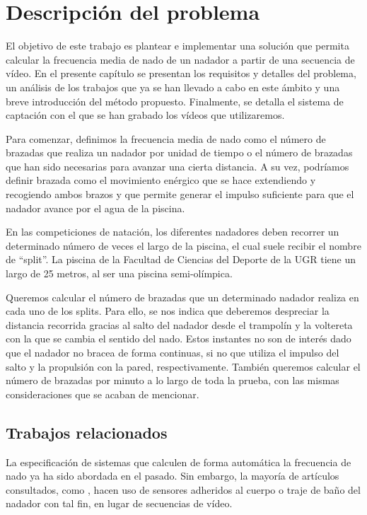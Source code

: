 \chapter{Descripción del problema} \label{cap:capitulo2}

El objetivo de este trabajo es plantear e implementar una solución que permita calcular la frecuencia media de nado de un nadador a partir de una secuencia de vídeo. En el presente capítulo se presentan los requisitos y detalles del problema, un análisis de los trabajos que ya se han llevado a cabo en este ámbito y una breve introducción del método propuesto. Finalmente, se detalla el sistema de captación con el que se han grabado los vídeos que utilizaremos.

Para comenzar, definimos la frecuencia media de nado como el número de brazadas que realiza un nadador por unidad de tiempo o el número de brazadas que han sido necesarias para avanzar una cierta distancia. A su vez, podríamos definir brazada como el movimiento enérgico que se hace extendiendo y recogiendo ambos brazos y que permite generar el impulso suficiente para que el nadador avance por el agua de la piscina.  

En las competiciones de natación, los diferentes nadadores deben recorrer un determinado número de veces el largo de la piscina, el cual suele recibir el nombre de ``split''. La piscina de la Facultad de Ciencias del Deporte de la UGR tiene un largo de 25 metros, al ser una piscina semi-olímpica. 

Queremos calcular el número de brazadas que un determinado nadador realiza en cada uno de los splits. Para ello, se nos indica que deberemos despreciar la distancia recorrida gracias al salto del nadador desde el trampolín y la voltereta con la que se cambia el sentido del nado. Estos instantes no son de interés dado que el nadador no bracea de forma continuas, si no que utiliza el impulso del salto y la propulsión con la pared, respectivamente. También queremos calcular el número de brazadas por minuto a lo largo de toda la prueba, con las mismas consideraciones que se acaban de mencionar.

\section{Trabajos relacionados}

La especificación de sistemas que calculen de forma automática la frecuencia de nado ya ha sido abordada en el pasado. Sin embargo, la mayoría de artículos consultados, como \cite{swimmerautostrokeratio}, hacen uso de sensores adheridos al cuerpo o traje de baño del nadador con tal fin, en lugar de secuencias de vídeo.

